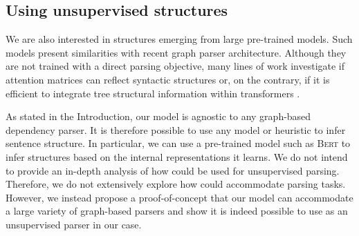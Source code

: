 

\subsection{Using unsupervised structures}


We are also interested in structures emerging from large pre-trained models. Such models present similarities with recent graph parser architecture. Although they are not trained with a direct parsing objective, many lines of work investigate if attention matrices can reflect syntactic structures \parencite{jawahar_19, clark_19, ravishankar_21} or, on the contrary, if it is efficient to integrate tree structural information within transformers \parencite{wang_19, bai_21}. 

As stated in the Introduction, our model is agnostic to any graph-based dependency parser. It is therefore possible to use any model or heuristic to infer sentence structure. 
In particular, we can use a pre-trained model such as \textsc{Bert} to infer structures based on the internal representations it learns. We do not intend to provide an in-depth analysis of how \bert could be used for unsupervised parsing. Therefore, we do not extensively explore how \bert could accommodate parsing tasks. However, we instead propose a proof-of-concept that our model can accommodate a large variety of graph-based parsers and show it is indeed possible to use \bert as an unsupervised parser in our case.


